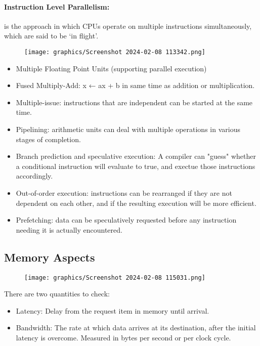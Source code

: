 \documentclass{article}
\begin{document}
\paragraph*{\textbf{Instruction Level Parallelism:}}is the approach in which CPUs operate on multiple instructions simultaneously, which are said to be `in flight'. 
\begin{figure}[h]
    \centering
    \texttt{[image: graphics/Screenshot 2024-02-08 113342.png]}
\end{figure}
\begin{itemize}
    \item Multiple Floating Point Units (supporting parallel execution)
    \item Fused Multiply-Add: x ← ax + b in same time as addition or multiplication.
    \item Multiple-issue: instructions that are independent can be started at the same time.
    \item Pipelining: arithmetic units can deal with multiple operations in various stages of completion.
    \item Branch prediction and speculative execution: A compiler can "guess" whether a conditional instruction will evaluate to true, and exectue those instructions accordingly.
    \item Out-of-order execution: instructions can be rearranged if they are not dependent on each other, and if the resulting execution will be more efficient.
    \item Prefetching: data can be speculatively requested before any instruction needing it is actually
    encountered.
\end{itemize}
\subsection*{Memory Aspects}
\begin{figure}[h]
    \centering
    \texttt{[image: graphics/Screenshot 2024-02-08 115031.png]}
\end{figure}
There are two quantities to check:
\begin{itemize}
    \item Latency: Delay from the request item in memory until arrival.
    \item Bandwidth: The rate at which data arrives at its destination, after the initial latency is overcome. Measured in bytes per second or per clock cycle.
\end{itemize}
\end{document}
